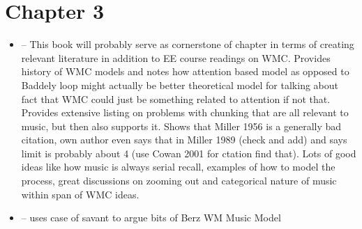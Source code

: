 \documentclass[]{book}
\begin{document}
\hypertarget{chapter-3}{%
\section{Chapter 3}\label{chapter-3}}

\begin{itemize}
\item
  \citep{cowanWorkingMemoryCapacity2005} -- This book will probably serve as cornerstone of chapter in terms of creating relevant literature in addition to EE course readings on WMC. Provides history of WMC models and notes how attention based model as opposed to Baddely loop might actually be better theoretical model for talking about fact that WMC could just be something related to attention if not that. Provides extensive listing on problems with chunking that are all relevant to music, but then also supports it. Shows that Miller 1956 is a generally bad citation, own author even says that in Miller 1989 (check and add) and says limit is probably about 4 (use Cowan 2001 for ctation find that). Lots of good ideas like how music is always serial recall, examples of how to model the process, great discussions on zooming out and categorical nature of music within span of WMC ideas.
\item
  \citep{ockelfordMusicModuleWorking2007} -- uses case of savant to argue bits of Berz WM Music Model
\end{itemize}


\end{document}
